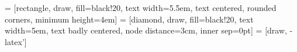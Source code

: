 %
%

 = [rectangle, draw, fill=black!20, text width=5.5em, text centered, rounded corners, minimum height=4em]
 = [diamond, draw, fill=black!20, text width=5em, text badly centered, node distance=3cm, inner sep=0pt]
 = [draw, -latex']